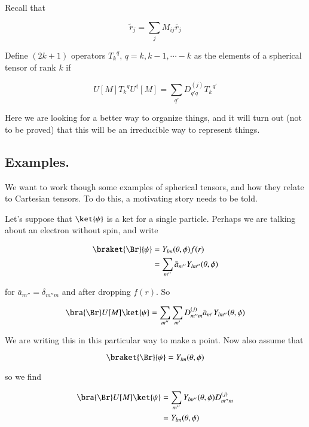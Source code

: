 Recall that 

\begin{equation}\label{eqn:qmTwoL19:290}
\tilde{r}_j = \sum_j M_{ij} \bar{r}_j
\end{equation}

Define $(2k + 1)$ operators ${T_k}^q$, $q = k, k-1, \cdots -k$ as the elements of a spherical tensor of rank $k$ if 

\begin{equation}\label{eqn:qmTwoL19:310}
U[M] {T_k}^q U^\dagger[M] = \sum_{q'} D^{(j)}_{q' q} {T_k}^{q'}
\end{equation}

Here we are looking for a better way to organize things, and it will turn out (not to be proved) that this will be an irreducible way to represent things.

\subsection{Examples.}

We want to work though some examples of spherical tensors, and how they relate to Cartesian tensors.  To do this, a motivating story needs to be told.

Let's suppose that $\ket{\psi}$ is a ket for a single particle.  Perhaps we are talking about an electron without spin, and write

\begin{align*}
\braket{\Br}{\psi} 
&= Y_{lm}(\theta, \phi) f(r) \\
&= \sum_{m''} \bar{a}_{m''} Y_{l m''}(\theta, \phi) 
\end{align*}

for $\bar{a}_{m''} = \delta_{m'' m}$ and after dropping $f(r)$.  So

\begin{equation}\label{eqn:qmTwoL19:330}
\bra{\Br} U[M] \ket{\psi} 
=
\sum_{m''} 
\sum_{m'} 
D^{(j)}_{m'' m} \bar{a}_{m'} Y_{l m''}(\theta, \phi) 
\end{equation}

We are writing this in this particular way to make a point.  Now also assume that

\begin{equation}\label{eqn:qmTwoL19:350}
\braket{\Br}{\psi} = Y_{lm}(\theta, \phi)
\end{equation}

so we find

\begin{align*}
\bra{\Br} U[M] \ket{\psi} 
&=
\sum_{m''} 
Y_{l m''}(\theta, \phi) 
D^{(j)}_{m'' m} \\
&=
Y_{l m}(\theta, \phi) 
\end{align*}

